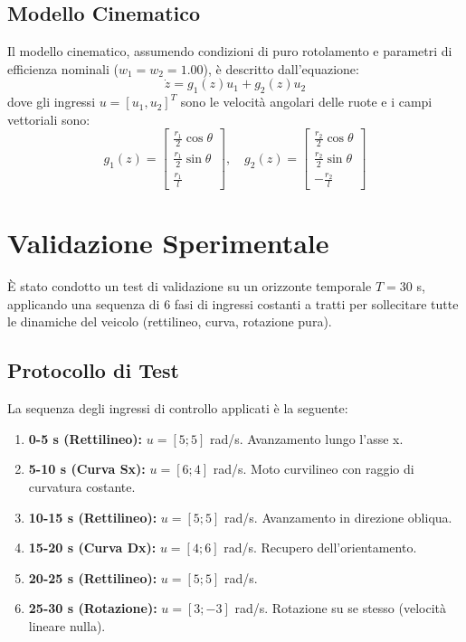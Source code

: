 \subsection{Modello Cinematico}
Il modello cinematico, assumendo condizioni di puro rotolamento e parametri di efficienza nominali (\( w_1 = w_2 = 1.00 \)), è descritto dall'equazione:
\begin{equation} \label{eq:modello_affine}
    \dot{z} = g_1(z)u_1 + g_2(z)u_2
\end{equation}
dove gli ingressi \( u = [u_1, u_2]^T \) sono le velocità angolari delle ruote e i campi vettoriali sono:
\begin{equation}
    g_1(z) = \begin{bmatrix} \frac{r_1}{2}\cos\theta \\ \frac{r_1}{2}\sin\theta \\ \frac{r_1}{l} \end{bmatrix}, \quad
    g_2(z) = \begin{bmatrix} \frac{r_2}{2}\cos\theta \\ \frac{r_2}{2}\sin\theta \\ -\frac{r_2}{l} \end{bmatrix}
\end{equation}

\section{Validazione Sperimentale}
È stato condotto un test di validazione su un orizzonte temporale \( T = 30 \) s, applicando una sequenza di 6 fasi di ingressi costanti a tratti per sollecitare tutte le dinamiche del veicolo (rettilineo, curva, rotazione pura).

\subsection{Protocollo di Test}
La sequenza degli ingressi di controllo applicati è la seguente:
\begin{enumerate}
    \item \textbf{0-5 s (Rettilineo):} \( u = [5; 5] \) rad/s. Avanzamento lungo l'asse x.
    \item \textbf{5-10 s (Curva Sx):} \( u = [6; 4] \) rad/s. Moto curvilineo con raggio di curvatura costante.
    \item \textbf{10-15 s (Rettilineo):} \( u = [5; 5] \) rad/s. Avanzamento in direzione obliqua.
    \item \textbf{15-20 s (Curva Dx):} \( u = [4; 6] \) rad/s. Recupero dell'orientamento.
    \item \textbf{20-25 s (Rettilineo):} \( u = [5; 5] \) rad/s.
    \item \textbf{25-30 s (Rotazione):} \( u = [3; -3] \) rad/s. Rotazione su se stesso (velocità lineare nulla).
\end{enumerate}

